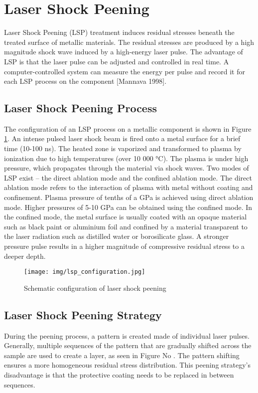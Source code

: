 \section{Laser Shock Peening}

Laser Shock Peening (LSP) treatment induces residual stresses beneath the treated surface of metallic materials. The residual stresses are produced by a high magnitude shock wave induced by a high-energy laser pulse. The advantage of LSP is that the laser pulse can be adjusted and controlled in real time. A computer-controlled system can measure the energy per pulse and record it for each LSP process on the component [Mannava 1998].

\subsection{Laser Shock Peening Process}
The configuration of an LSP process on a metallic component is shown in Figure \ref{fig:lspconfiguration}. An intense pulsed laser shock beam is fired onto a metal surface for a brief time (10-100 ns). The heated zone is vaporized and transformed to plasma by ionization due to high temperatures (over 10 000 °C). The plasma is under high pressure, which propagates through the material via shock waves. Two modes of LSP exist – the direct ablation mode and the confined ablation mode. The direct ablation mode refers to the interaction of plasma with metal without coating and confinement. Plasma pressure of tenths of a GPa is achieved using direct ablation mode. Higher pressures of 5-10 GPa can be obtained using the confined mode. In the confined mode, the metal surface is usually coated with an opaque material such as black paint or aluminium foil and confined by a material transparent to the laser radiation such as distilled water or borosilicate glass. A stronger pressure pulse results in a higher magnitude of compressive residual stress to a deeper depth.

\begin{figure}[h]
    \centering
    \texttt{[image: img/lsp\_configuration.jpg]}
    \caption{Schematic configuration of laser shock peening}
    \label{fig:lspconfiguration}
\end{figure}

\subsection{Laser Shock Peening Strategy}
During the peening process, a pattern is created made of individual laser pulses. Generally, multiple sequences of the pattern that are gradually shifted across the sample are used to create a layer, as seen in Figure No . The pattern shifting ensures a more homogeneous residual stress distribution. This peening strategy's disadvantage is that the protective coating needs to be replaced in between sequences.

